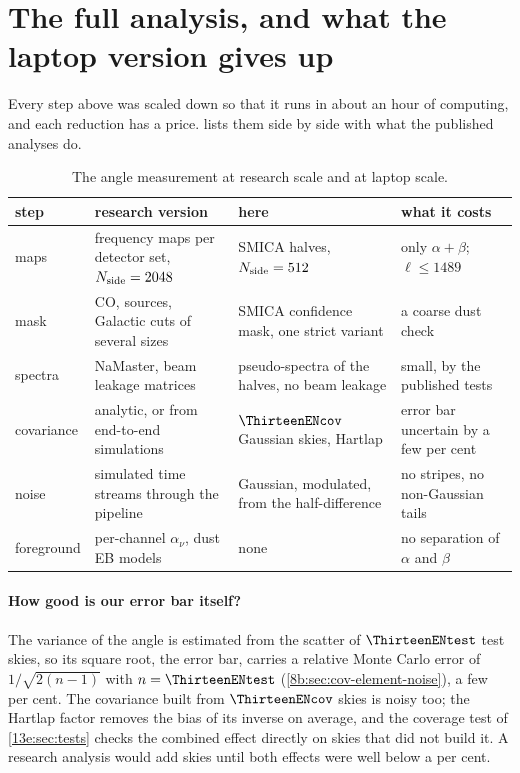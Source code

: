 \section{The full analysis, and what the laptop version gives up}
\label{13e:sec:research}

Every step above was scaled down so that it runs in about an hour of computing, and each reduction has a
price.  lists them side by side with what the published analyses do.

\begin{table}[htbp]
\centering\footnotesize
\begin{tabularx}{\linewidth}{@{}lXXX@{}}
\toprule
step & research version & here & what it costs\\
\midrule
maps & frequency maps per detector set, $N_{\rm side}=2048$ & SMICA halves, $N_{\rm side}=512$ & only $\alpha+\beta$; $\ell\le1489$\\
mask & CO, sources, Galactic cuts of several sizes & SMICA confidence mask, one strict variant & a coarse dust check\\
spectra & NaMaster, beam leakage matrices & pseudo-spectra of the halves, no beam leakage & small, by the published tests\\
covariance & analytic, or from end-to-end simulations & $\ThirteenENcov$ Gaussian skies, Hartlap & error bar uncertain by a few per cent\\
noise & simulated time streams through the pipeline & Gaussian, modulated, from the half-difference & no stripes, no non-Gaussian tails\\
foreground & per-channel $\alpha_\nu$, dust EB models & none & no separation of $\alpha$ and $\beta$\\
\bottomrule
\end{tabularx}
\caption{The angle measurement at research scale and at laptop scale.}
\label{13e:tab:research}
\end{table}

\paragraph{How good is our error bar itself?} The variance of the angle is estimated from the scatter of
$\ThirteenENtest$ test skies, so its square root, the error bar, carries a relative Monte Carlo error of
$1/\sqrt{2(n-1)}$ with $n=\ThirteenENtest$ (\cref{8b:sec:cov-element-noise}), a few per cent. The covariance
built from $\ThirteenENcov$ skies is noisy too; the Hartlap factor removes the bias of its inverse on average,
and the coverage test of \cref{13e:sec:tests} checks the combined effect directly on skies that did not build
it. A research analysis would add skies until both effects were well below a per cent.

